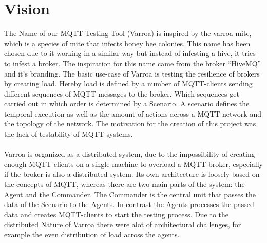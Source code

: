 \chapter{Vision}
The Name of our MQTT-Testing-Tool (Varroa) is inspired by the varroa mite, which is a species of mite that infects honey bee colonies.
This name has been chosen due to it working in a similar way but instead of infesting a hive, it tries to infest a broker.
The inspiration for this name came from the broker \enquote{HiveMQ} and it's branding.
The basic use-case of Varroa is testing the resilience of brokers by creating load.
Hereby load is defined by a number of MQTT-clients sending different sequences of MQTT-messages to the broker. 
Which sequences get carried out in which order is determined by a Scenario.
A scenario defines the temporal execution as well as the amount of actions across a MQTT-network and the topology of the network.
The motivation for the creation of this project was the lack of testability of MQTT-systems.\\
\\
Varroa is organized as a distributed system, due to the impossibility of creating enough MQTT-clients on a single machine to overload a MQTT-broker, especially if the broker is also a distributed system.
Its own architecture is loosely based on the concepts of MQTT, whereas there are two main parts of the system: the Agent and the Commander.
The Commander is the central unit that passes the data of the Scenario to the Agents.
In contrast the Agents processes the passed data and creates MQTT-clients to start the testing process.
Due to the distributed Nature of Varroa there were alot of architectural challenges, for example the even distribution of load across the agents.

